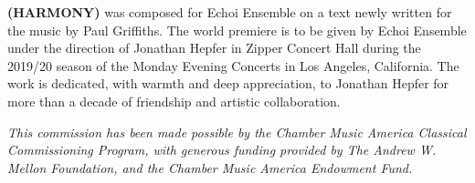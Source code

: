 \textbf{(HARMONY)} was composed for Echoi Ensemble on a text newly written for
the music by Paul Griffiths. The world premiere is to be given by Echoi
Ensemble under the direction of Jonathan Hepfer in Zipper Concert Hall during
the 2019/20 season of the Monday Evening Concerts in Los Angeles, California.
The work is dedicated, with warmth and deep appreciation, to Jonathan Hepfer
for more than a decade of friendship and artistic collaboration.

\textit{This commission has been made possible by the Chamber Music America
Classical Commissioning Program, with generous funding provided by The Andrew
W. Mellon Foundation, and the Chamber Music America Endowment Fund.}
